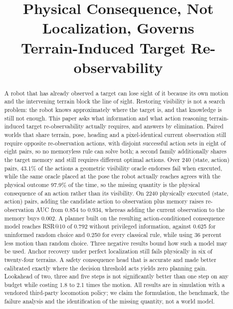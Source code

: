 \documentclass[conference]{IEEEtran}
\begin{document}
\title{Physical Consequence, Not Localization, Governs\\
Terrain-Induced Target Re-observability}

\author{
}

\maketitle

\begin{abstract}
A robot that has already observed a target can lose sight of it because its own
motion and the intervening terrain block the line of sight. Restoring visibility is
not a search problem: the robot knows approximately where the target is, and that
knowledge is still not enough. This paper asks what information and what action
reasoning terrain-induced target re-observability actually requires, and answers by
elimination. Paired worlds that share terrain, pose, heading and a pixel-identical
current observation still require opposite re-observation actions, with disjoint
successful action sets in eight of eight pairs, so no memoryless rule can solve both;
a second family additionally shares the target memory and still requires different
optimal actions. Over 240 (state, action) pairs, 43.1\% of the actions a geometric
visibility oracle endorses fail when executed, while the same oracle placed at the
pose the robot actually reaches agrees with the physical outcome 97.9\% of the time,
so the missing quantity is the physical consequence of an action rather than its
visibility. On 2240 physically executed (state, action) pairs, adding the candidate
action to observation plus memory raises re-observation AUC from 0.854 to 0.934,
whereas adding the current observation to the memory buys 0.002. A planner built on
the resulting action-conditioned consequence model reaches RSR@10 of 0.792 without
privileged information, against 0.625 for uninformed random choice and 0.250 for every
classical rule, while using 36 percent less motion than random choice. Three negative results
bound how such a model may be used. Anchor recovery under perfect localization still
fails physically in six of twenty-four terrains. A safety consequence head that is
accurate and made better calibrated exactly where the decision threshold acts yields
zero planning gain. Lookahead of two, three and five steps is not significantly
better than one step on any budget while costing 1.8 to 2.1 times the motion. All
results are in simulation with a vendored third-party locomotion policy; we claim the
formulation, the benchmark, the failure analysis and the identification of the
missing quantity, not a world model.
\end{abstract}
\end{document}
